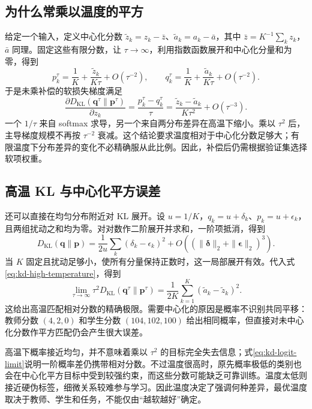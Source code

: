 \documentclass[UTF8,12pt,a4paper,fontset=fandol]{ctexart}
\begin{document}
\subsection{为什么常乘以温度的平方}
给定一个输入，定义中心化分数 $\widetilde z_k=z_k-\bar z$、$\widetilde a_k=a_k-\bar a$，其中 $\bar z=K^{-1}\sum_kz_k$，$\bar a$ 同理。固定这些有限分数，让 $\tau\to\infty$，利用指数函数展开和中心化分量和为零，得到
\begin{equation}
 p_k^\tau=\frac1K+\frac{\widetilde z_k}{K\tau}+O(\tau^{-2}),\qquad
 q_k^\tau=\frac1K+\frac{\widetilde a_k}{K\tau}+O(\tau^{-2}).
 \label{eq:kd-high-temperature}
\end{equation}
于是未乘补偿的软损失梯度满足
\begin{equation}
 \frac{\partial D_{\mathrm{KL}}(\mathbf q^\tau\|\mathbf p^\tau)}{\partial z_k}
 =\frac{p_k^\tau-q_k^\tau}{\tau}
 =\frac{\widetilde z_k-\widetilde a_k}{K\tau^2}+O(\tau^{-3}).
 \label{eq:kd-tau-squared}
\end{equation}
一个 $1/\tau$ 来自 softmax 求导，另一个来自两分布差异在高温下缩小。乘以 $\tau^2$ 后，主导梯度规模不再按 $\tau^{-2}$ 衰减。这个结论要求温度相对于中心化分数足够大；有限温度下分布差异的变化不必精确服从此比例。因此，补偿后仍需根据验证集选择软项权重。

\subsection{高温 KL 与中心化平方误差}
还可以直接在均匀分布附近对 KL 展开。设 $u=1/K$，$q_k=u+\delta_k$、$p_k=u+\epsilon_k$，且两组扰动之和均为零。对对数作二阶展开并求和，一阶项抵消，得到
\[
 D_{\mathrm{KL}}(\mathbf q\|\mathbf p)
 =\frac1{2u}\sum_k(\delta_k-\epsilon_k)^2
 +O\!\left((\|\boldsymbol\delta\|_2+\|\boldsymbol\epsilon\|_2)^3\right).
\]
当 $K$ 固定且扰动足够小，使所有分量保持正数时，这一局部展开有效。代入式\eqref{eq:kd-high-temperature}，得到
\begin{equation}
 \lim_{\tau\to\infty}\tau^2D_{\mathrm{KL}}(\mathbf q^\tau\|\mathbf p^\tau)
 =\frac1{2K}\sum_{k=1}^K(\widetilde a_k-\widetilde z_k)^2.
 \label{eq:kd-logit-limit}
\end{equation}
这给出高温匹配相对分数的精确极限。需要中心化的原因是概率不识别共同平移：教师分数 $(4,2,0)$ 和学生分数 $(104,102,100)$ 给出相同概率，但直接对未中心化分数作平方匹配仍会产生很大误差。

高温下概率接近均匀，并不意味着乘以 $\tau^2$ 的目标完全失去信息；式\eqref{eq:kd-logit-limit}说明一阶概率差仍携带相对分数。不过温度很高时，原先概率极低的类别也会在中心化平方目标中受到较强约束，而这些分数可能缺乏可靠训练。温度太低则接近硬伪标签，细微关系较难参与学习。因此温度决定了强调何种差异，最优温度取决于教师、学生和任务，不能仅由“越软越好”确定。
\end{document}
